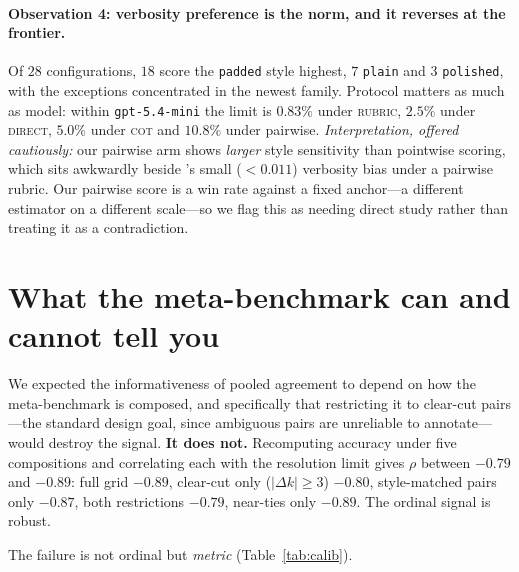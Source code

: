 \documentclass{article}
\theoremstyle{plain}
\theoremstyle{definition}
\begin{document}
\paragraph{Observation 4: verbosity preference is the norm, and it reverses at the frontier.}
Of $28$ configurations, $18$ score the \texttt{padded} style highest, $7$ \texttt{plain} and
$3$ \texttt{polished}, with the exceptions concentrated in the newest family. Protocol matters
as much as model: within \texttt{gpt-5.4-mini} the limit is $0.83\%$ under \textsc{rubric},
$2.5\%$ under \textsc{direct}, $5.0\%$ under \textsc{cot} and $10.8\%$ under pairwise.
\emph{Interpretation, offered cautiously:} our pairwise arm shows \emph{larger} style
sensitivity than pointwise scoring, which sits awkwardly beside
\citet{norman2026reliability}'s small ($<0.011$) verbosity bias under a pairwise rubric. Our
pairwise score is a win rate against a fixed anchor---a different estimator on a different
scale---so we flag this as needing direct study rather than treating it as a contradiction.

\section{What the meta-benchmark can and cannot tell you}
\label{sec:composition}

We expected the informativeness of pooled agreement to depend on how the meta-benchmark is
composed, and specifically that restricting it to clear-cut pairs---the standard design goal,
since ambiguous pairs are unreliable to annotate---would destroy the signal. \textbf{It does
not.} Recomputing accuracy under five compositions and correlating each with the resolution
limit gives $\rho$ between $-0.79$ and $-0.89$: full grid $-0.89$, clear-cut only
($|\Delta k|\ge3$) $-0.80$, style-matched pairs only $-0.87$, both restrictions $-0.79$,
near-ties only $-0.89$. The ordinal signal is robust.

The failure is not ordinal but \emph{metric} (Table~\ref{tab:calib}).
\end{document}
